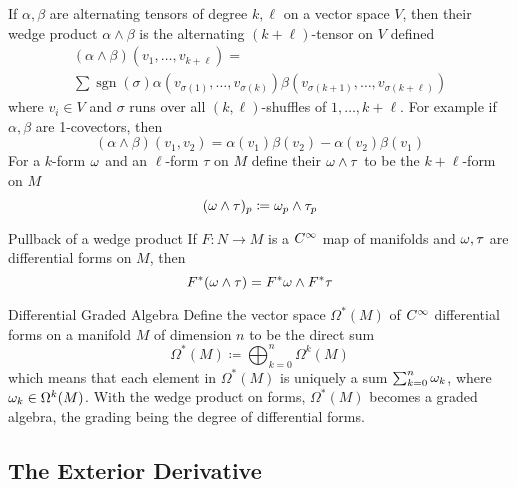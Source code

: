 If \(\alpha, \beta\) are alternating tensors of degree \(k, \ell\) on a vector space \(V\), then their wedge product \(\alpha \wedge \beta\) is the alternating \((k+\ell)\)-tensor on \(V\) defined 
\begin{multline}
    (\alpha \wedge \beta)(v_1, \dots, v_{k+\ell}) = \\ \sum \operatorname{sgn}(\sigma) \alpha(v_{\sigma(1)}, \dots, v_{\sigma(k)})\beta(v_{\sigma(k+1)}, \dots, v_{\sigma(k+\ell)})   
\end{multline}
where \(v_i \in V\) and \(\sigma\) runs over all \((k, \ell)\)-shuffles of \(1, \dots, k+\ell\).
For example if \(\alpha, \beta\) are 1-covectors, then 
\[
    (\alpha \wedge \beta)(v_1, v_2) = \alpha(v_1)\beta(v_2) - \alpha(v_2)\beta(v_1)   
\]
For a \(k\)-form \(\omega\) and an \(\ell\)-form \(\tau\) on \(M\) define their  \(\omega \wedge \tau\) to be the \(k+\ell\)-form on \(M\)
\[
    (\omega \wedge \tau)_p \coloneqq \omega_p \wedge \tau_p
\]

\begin{proposition}{Pullback of a wedge product}{}
    If \(F \colon N \rightarrow M\) is a \(C^\infty\) map of manifolds and \(\omega, \tau\) are differential forms on \(M\), then 
    \[
        F^* (\omega \wedge \tau) = F^* \omega \wedge F^* \tau   
    \]
\end{proposition}
\begin{definition}{Differential Graded Algebra}{}
    Define the vector space \(\Omega^* (M)\) of \(C^\infty\) differential forms on a manifold \(M\) of dimension \(n\) to be the direct sum 
    \[
        \Omega^*(M) \coloneqq \bigoplus_{k=0}^n \Omega^k (M)     
    \]
    which means that each element in \(\Omega^* (M)\) is uniquely a sum \(\sum_{k=0}^n \omega_k\), where \(\omega_k \in \Omega^k (M)\).
    With the wedge product on forms, \(\Omega^* (M)\) becomes a graded algebra, the grading being the degree of differential forms.
\end{definition}

\subsection{The Exterior Derivative}

